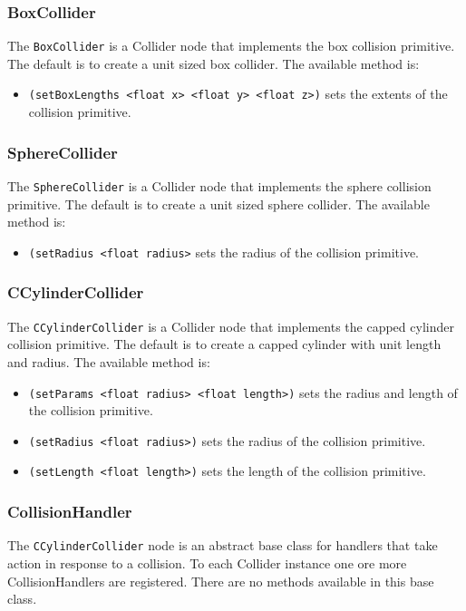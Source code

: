 \subsubsection{BoxCollider}
The \texttt{BoxCollider} is a Collider node that implements the box
collision primitive. The default is to create a unit sized box
collider. The available method is:

\begin{itemize}
\item \texttt{(setBoxLengths <float x> <float y> <float z>)} sets the
  extents of the collision primitive.
\end{itemize}

\subsubsection{SphereCollider}
The \texttt{SphereCollider} is a Collider node that implements the sphere
collision primitive. The default is to create a unit sized sphere
collider. The available method is:

\begin{itemize}
\item \texttt{(setRadius <float radius>} sets the radius of the
  collision primitive.
\end{itemize}

\subsubsection{CCylinderCollider}
The \texttt{CCylinderCollider} is a Collider node that implements the
capped cylinder collision primitive. The default is to create a capped
cylinder with unit length and radius. The available method is:

\begin{itemize}
\item \texttt{(setParams <float radius> <float length>)} sets the
  radius and length of the collision primitive.
\item \texttt{(setRadius <float radius>)} sets the radius of the
  collision primitive.
\item \texttt{(setLength <float length>)} sets the length of the
  collision primitive.
\end{itemize}

\subsubsection{CollisionHandler}
The \texttt{CCylinderCollider} node is an abstract base class for
handlers that take action in response to a collision. To each Collider
instance one ore more CollisionHandlers are registered. There are no
methods available in this base class.

